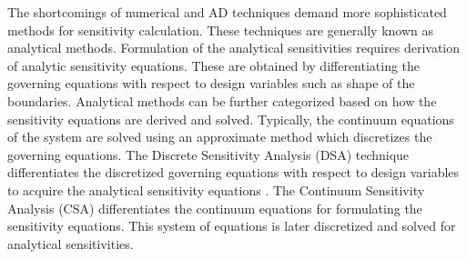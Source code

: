 The shortcomings of numerical and AD techniques demand more sophisticated methods for sensitivity calculation. These techniques are generally known as analytical methods. Formulation of the analytical sensitivities requires derivation of analytic sensitivity equations. These are obtained by differentiating the governing equations with respect to design variables such as shape of the boundaries. Analytical methods can be further categorized based on how the sensitivity equations are derived and solved. Typically, the continuum equations of the system are solved using an approximate method which discretizes the governing equations. The Discrete Sensitivity Analysis (DSA) technique differentiates the discretized governing equations with respect to design variables to acquire the analytical sensitivity equations \cite{choi2006structural}. The Continuum Sensitivity Analysis (CSA) differentiates the continuum equations for formulating the sensitivity equations. This system of equations is later discretized and solved for analytical sensitivities.

